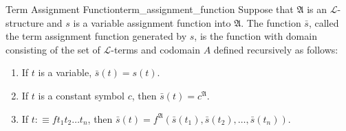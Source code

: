 \begin{definition}{Term Assignment Function}{term_assignment_function}
Suppose that $\mathfrak{A}$ is an $\mathcal{L}$-structure and $s$ is a variable assignment function into $\mathfrak{A}$. The function $\bar{s}$, called the term assignment function generated by $s$, is the function with domain consisting of the set of $\mathcal{L}$-terms and codomain $A$ defined recursively as follows:
\begin{enumerate}
    \item If $t$ is a variable, $\bar{s}(t)=s(t)$.
    \item If $t$ is a constant symbol $c$, then $\bar{s}(t)=c^{\mathfrak{A}}$.
    \item If $t: \equiv f t_{1} t_{2} \ldots t_{n}$, then $\bar{s}(t)=f^{\mathfrak{A}}\left(\bar{s}\left(t_{1}\right), \bar{s}\left(t_{2}\right), \ldots, \bar{s}\left(t_{n}\right)\right)$.
\end{enumerate}
\end{definition}
